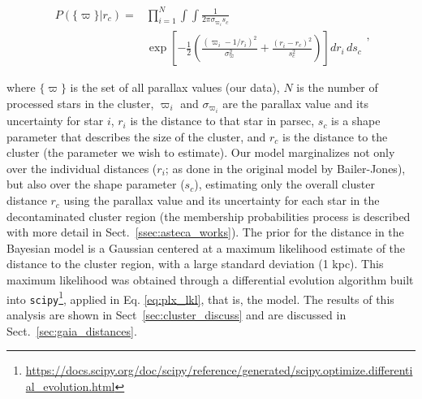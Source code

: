 \documentclass[draft]{aa}
\begin{document}
\begin{equation}
\begin{aligned}
P\left(\{\varpi\} | r_{c}\right)
= & {} \prod_{i=1}^{N} \int \int \frac{1}{2 \pi \sigma_{\varpi_{i}} s_{c}} \\
& \exp \left[-\frac{1}{2} \left( \frac{\left(\varpi_{i}-1 / r_{i}\right)^{2}}{
\sigma_{\varpi}^{2}} + \frac{\left(r_{i}-r_{c}\right)^{2}}{s_{c}^
{2}}\right)\right]
d r_{i}\,d s_{c}
\label{eq:plx_lkl}
\end{aligned}
,\end{equation}

\noindent where $\{\varpi\}$ is the set of all parallax values (our
data), $N$ is the number of processed stars in the cluster,
$\varpi_{i}$ and $\sigma_{\varpi_{i}}$ are the parallax value and its
uncertainty for star $i$, $r_{i}$ is the distance to that star in parsec,
$s_{c}$ is a shape parameter that describes the size of the cluster, and
$r_{c}$ is the distance to the cluster (the parameter we wish to estimate).
%
Our model marginalizes not only over the individual distances ($r_i$;
as done in the original model by Bailer-Jones), but also
over the shape parameter ($s_c$), estimating only the overall cluster distance
$r_c$ using the parallax value and its uncertainty for each star in the
decontaminated cluster region (the membership probabilities process is
described with more detail in Sect.~\ref{ssec:asteca_works}).
%
The prior for the distance in the Bayesian model is a Gaussian centered at a
maximum likelihood estimate of the distance to the cluster region, with a large
standard deviation (1 kpc). This maximum likelihood was
obtained through a differential evolution algorithm built into
\texttt{scipy}\footnote{\url{https://docs.scipy.org/doc/scipy/reference/generated/scipy.optimize.differential_evolution.html}},
applied in Eq. \ref{eq:plx_lkl}, that is, the model.
%
The results of this analysis are shown in Sect~\ref{sec:cluster_discuss}
and are discussed in Sect.~\ref{sec:gaia_distances}.
\end{document}
